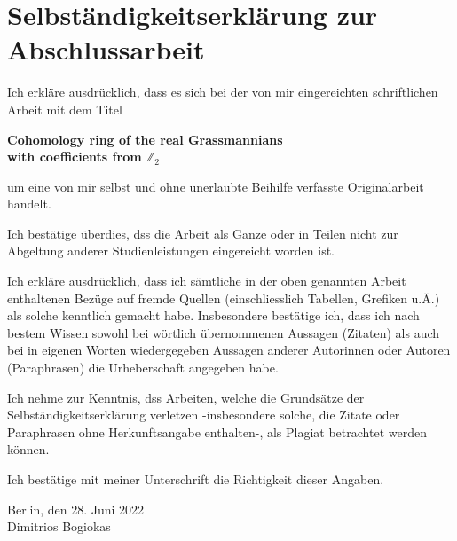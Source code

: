 \chapter*{Selbst\"{a}ndigkeitserkl\"{a}rung zur Abschlussarbeit}

Ich erkl\"{a}re ausdr\"{u}cklich, dass es sich bei der von mir eingereichten schriftlichen Arbeit mit dem Titel
\begin{center}
	{\bf Cohomology ring of the real Grassmannians\\
		with coefficients from $\mathbb{Z}_2$}
\end{center}
um eine von mir selbst und ohne unerlaubte Beihilfe verfasste Originalarbeit handelt.

Ich best\"{a}tige \"{u}berdies, dss die Arbeit als Ganze oder in Teilen nicht zur Abgeltung anderer Studienleistungen eingereicht worden ist.

Ich erkl\"{a}re ausdr\"{u}cklich, dass ich s\"{a}mtliche in der oben genannten Arbeit enthaltenen Bez\"{u}ge auf fremde Quellen (einschliesslich Tabellen, Grefiken u.\"{A}.) als solche kenntlich gemacht habe.
Insbesondere best\"{a}tige ich, dass ich nach bestem Wissen sowohl bei w\"{o}rtlich \"{u}bernommenen Aussagen (Zitaten) als auch bei in eigenen Worten wiedergegeben Aussagen anderer Autorinnen oder Autoren (Paraphrasen) die Urheberschaft angegeben habe.

Ich nehme zur Kenntnis, dss Arbeiten, welche die Grunds\"{a}tze der Selbst\"{a}ndigkeitserkl\"{a}rung verletzen -insbesondere solche, die Zitate oder Paraphrasen ohne Herkunftsangabe enthalten-, als Plagiat betrachtet werden k\"{o}nnen.

Ich best\"{a}tige mit meiner Unterschrift die Richtigkeit dieser Angaben.

Berlin, den 28. Juni 2022\\
Dimitrios Bogiokas
